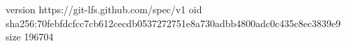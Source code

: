 version https://git-lfs.github.com/spec/v1
oid sha256:70febfdcfcc7cb612cecdb0537272751e8a730adbb4800adc0c435c8ec3839e9
size 196704
